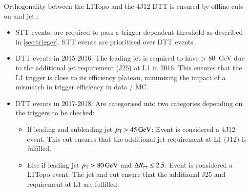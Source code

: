 Orthogonality between the L1Topo and the 4J12 DTT is ensured by offline cuts on
\tauhadvis and jet \pT:
\begin{itemize}
\item STT events: \tauhadvis are required to pass a trigger-dependent \pT
  threshold as described in \cref{sec:trigger}. STT events are prioritised over
  DTT events.

\item DTT events in 2015-2016: The leading jet is required to have \pT >
  \SI{80}{\GeV} due to the additional jet requirement (J25) at L1 in 2016. This
  ensures that the L1 trigger is close to its efficiency plateau, minimizing the
  impact of a mismatch in trigger efficiency in data / MC.

\item DTT events in 2017-2018: Are categorised into two categories depending on
  the triggers to be checked:
  \begin{itemize}
  \item If leading and subleading jet $p_{\text{T}} > \SI{45}{\ensuremath{\text{GeV}}}$: Event is considered a
    4J12 event. This cut ensures that the additional jet requirement at L1 (J12)
    is fulfilled.
  \item Else if leading jet $\pT > \SI{80}{\GeV}$ and $\Delta R_{\tau\tau} \leq 2.5$:
    Event is considered a L1Topo event. The jet \pT and \dRtautau cut ensure
    that the additional J25 and \dRtautau requirement at L1 are fulfilled.
  \end{itemize}
\end{itemize}







